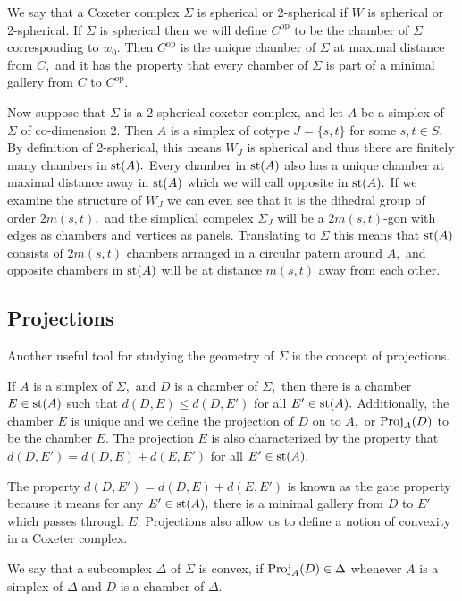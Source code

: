 \documentclass[class=book, crop=false,12 pt]{standalone}
\newcommand{\cop}{\ensuremath{C^{\text{op}}}}
\begin{document}
We say that a Coxeter complex $\Sigma$ is spherical or 2-spherical if $W$ is spherical or 2-spherical. If $\Sigma$ is spherical then we will define $C^{\text{op}}$ to be the chamber of $\Sigma$ corresponding to $w_0.$ Then $\cop$ is the unique chamber of $\Sigma$ at maximal distance from $C,$ and it has the property that every chamber of $\Sigma$ is part of a minimal gallery from $C$ to $\cop.$ 

Now suppose that $\Sigma$ is a 2-spherical coxeter complex, and let $A$ be a simplex of $\Sigma$ of co-dimension 2. Then $A$ is a simplex of cotype $J=\{s,t\}$ for some $s,t\in S.$ By definition of 2-spherical, this means $W_J$ is spherical and thus there are finitely many chambers in $\mathrm{st}(A).$ Every chamber in $\mathrm{st}(A)$ also has a unique chamber at maximal distance away in $\mathrm{st}(A)$ which we will call opposite in $\mathrm{st}(A).$ If we examine the structure of $W_J$ we can even see that it is the dihedral group of order $2m(s,t),$ and the simplical compelex $\Sigma_J$ will be a $2m(s,t)$-gon with edges as chambers and vertices as panels. Translating to $\Sigma$ this means that $\mathrm{st}(A)$ consists of $2m(s,t)$ chambers arranged in a circular patern around $A,$ and opposite chambers in $\mathrm{st}(A)$ will be at distance $m(s,t)$ away from each other. 

\subsection{Projections}
Another useful tool for studying the geometry of $\Sigma$ is the concept of projections. 

\begin{theorem}
	If $A$ is a simplex of $\Sigma,$ and $D$ is a chamber of $\Sigma,$ then there is a chamber $E\in \mathrm{st}(A)$ such that $d(D,E)\le d(D,E')$ for all $E'\in \mathrm{st}(A).$ Additionally, the chamber $E$ is unique and we define the projection of $D$ on to $A,$ or $\mathrm{Proj}_A(D)$ to be the chamber $E.$ The projection $E$ is also characterized by the property that $d(D,E')=d(D,E)+d(E,E')$ for all $E'\in \mathrm{st}(A).$
\end{theorem}

The property $d(D,E')=d(D,E)+d(E,E')$ is known as the gate property because it means for any $E'\in \mathrm{st}(A),$ there is a minimal gallery from $D$ to $E'$ which passes through $E.$ Projections also allow us to define a notion of convexity in a Coxeter complex.

\begin{defn}
	\label{defn:convex}
	We say that a subcomplex $\Delta$ of $\Sigma$ is convex, if $\mathrm{Proj}_{A}(D)\in \Delta$ whenever $A$ is a simplex of $\Delta$ and $D$ is a chamber of $\Delta.$
\end{defn}
\end{document}
